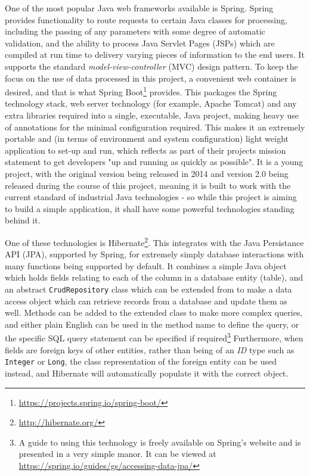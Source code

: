 One of the most popular Java web frameworks available is Spring. Spring provides functionality to route requests to certain Java classes for processing, including the passing of any parameters with some degree of automatic validation, and the ability to process Java Servlet Pages (JSPs) which are compiled at run time to delivery varying pieces of information to the end users. It supports the standard \textit{model-view-controller} (MVC) design pattern. To keep the focus on the use of data processed in this project, a convenient web container is desired, and that is what Spring Boot\footnote{\href{https://projects.spring.io/spring-boot/}{https://projects.spring.io/spring-boot/}} provides. This packages the Spring technology stack, web server technology (for example, Apache Tomcat) and any extra libraries required into a single, executable, Java project, making heavy use of annotations for the minimal configuration required. This makes it an extremely portable and (in terms of environment and system configuration) light weight application to set-up and run, which reflects as part of their projects mission statement to get developers "up and running as quickly as possible". It is a young project, with the original version being released in 2014 and version 2.0 being released during the course of this project, meaning it is built to work with the current standard of industrial Java technologies - so while this project is aiming to build a simple application, it shall have some powerful technologies standing behind it.

One of these technologies is Hibernate\footnote{\href{http://hibernate.org/}{http://hibernate.org/}}. This integrates with the Java Persistance API (JPA), supported by Spring, for extremely simply database interactions with many functions being supported by default. It combines a simple Java object which holds fields relating to each of the column in a database entity (table), and an abstract \texttt{CrudRepository} class which can be extended from to make a data access object which can retrieve records from a database and update them as well. Methods can be added to the extended class to make more complex queries, and either plain English can be used in the method name to define the query, or the specific SQL query statement can be specified if required\footnote{A guide to using this technology is freely available on Spring's website and is presented in a very simple manor. It can be viewed at \href{https://spring.io/guides/gs/accessing-data-jpa/}{https://spring.io/guides/gs/accessing-data-jpa/}} Furthermore, when fields are foreign keys of other entities, rather than being of an \textit{ID} type such as \texttt{Integer} or \texttt{Long}, the class representation of the foreign entity can be used instead, and Hibernate will automatically populate it with the correct object.

